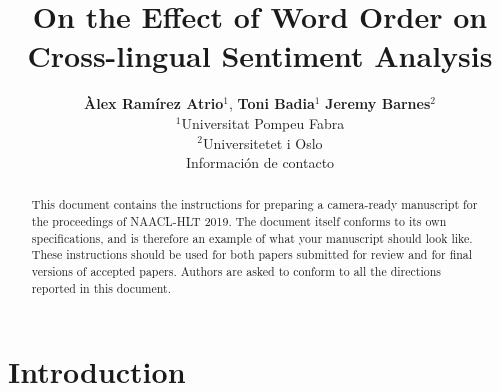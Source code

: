 \documentclass[11pt,a4paper]{article}
\title{On the Effect of Word Order on Cross-lingual Sentiment Analysis}
\author {\textbf{Àlex Ramírez Atrio$^1$}, \textbf{Toni Badia$^{1}$} \textbf{Jeremy Barnes$^{2}$}\\
$^1$Universitat Pompeu Fabra\\
$^2$Universitetet i Oslo\\
Información de contacto\\
}
\date{}
\begin{document}
\maketitle
\begin{abstract}
  This document contains the instructions for preparing a camera-ready
  manuscript for the proceedings of NAACL-HLT 2019. The document itself
  conforms to its own specifications, and is therefore an example of
  what your manuscript should look like. These instructions should be
  used for both papers submitted for review and for final versions of
  accepted papers.  Authors are asked to conform to all the directions
  reported in this document.
\end{abstract}


\section{Introduction}
\end{document}

